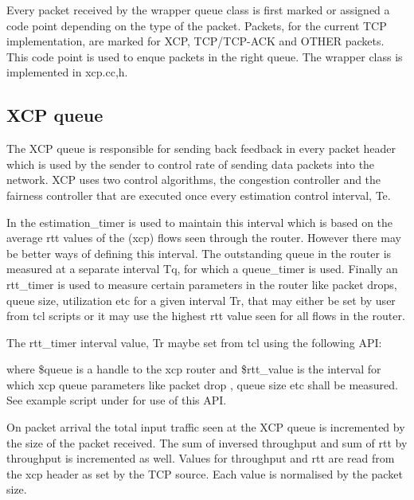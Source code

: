     Every packet received by the wrapper queue class is first marked or
    assigned a code point depending on the type of the packet. Packets,
    for the current TCP implementation, are marked for XCP, TCP/TCP-ACK
    and OTHER packets. This code point is used to enque packets in the right
    queue. The wrapper class is implemented in xcp.{cc,h}.
    
    
    \subsection{XCP queue}
    \label{sec:xcp_queue}

    The XCP queue is responsible for sending back feedback in every packet
    header which is used by the sender to control rate of sending data
    packets into the network. XCP uses two control algorithms, the
    congestion controller and the fairness controller that are executed
    once every estimation control interval, Te. 

    In \ns{}  the
    estimation\_timer is used to maintain this interval which is based on
    the average rtt values of the (xcp) flows seen through the router. However
    there may be better ways of defining this interval. The outstanding
    queue in the router is measured at a separate interval Tq, for which a
    queue\_timer is used. Finally an rtt\_timer is used to measure certain
    parameters in the router like packet drops, queue size, utilization 
    etc for a given interval Tr, that may either be set by user from tcl
    scripts or it may use the highest rtt value seen for all flows in the
    router. 

    The rtt\_timer interval value, Tr maybe set from tcl using the
    following API: 
    
    
    where \$queue is a handle to the xcp router and \$rtt\_value is the
    interval for which xcp queue parameters like packet drop , queue size etc
    shall be measured. See example script under
     for use of
    this API.
    
    On packet arrival the total input traffic seen at the XCP queue is
    incremented by the size of the packet received. The sum of inversed
    throughput and sum of rtt by throughput is incremented as
    well. Values for throughput and rtt are read from the xcp header as
    set by the TCP source. Each value is normalised by the packet size.
    
